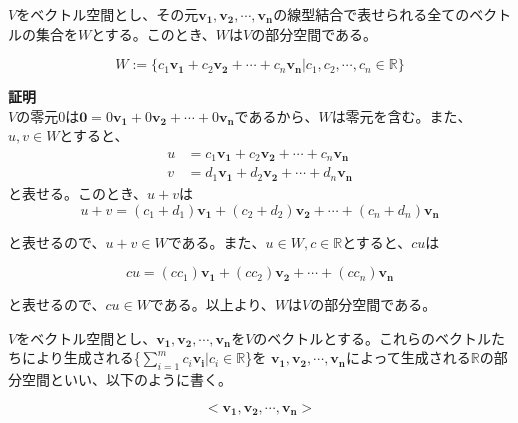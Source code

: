 \documentclass{jlreq}
\begin{document}
\begin{theorembox}[定理1]
  $V$をベクトル空間とし、その元$\boldsymbol{v_1}, \boldsymbol{v_2}, \cdots, \boldsymbol{v_n}$の線型結合で表せられる全てのベクトルの集合を$W$とする。このとき、$W$は$V$の部分空間である。

  \begin{equation*}
    W := \{ c_1 \boldsymbol{v_1} + c_2 \boldsymbol{v_2} + \cdots + c_n \boldsymbol{v_n} | c_1, c_2, \cdots, c_n \in \mathbb{R} \}
  \end{equation*}

  \dotfill

  \textbf{証明} \\

  $V$の零元0は$\boldsymbol{0} = 0 \boldsymbol{v_1} + 0 \boldsymbol{v_2} + \cdots + 0 \boldsymbol{v_n}$であるから、$W$は零元を含む。また、$u, v \in W$とすると、
  \begin{align*}
    u &= c_1 \boldsymbol{v_1} + c_2 \boldsymbol{v_2} + \cdots + c_n \boldsymbol{v_n} \\
    v &= d_1 \boldsymbol{v_1} + d_2 \boldsymbol{v_2} + \cdots + d_n \boldsymbol{v_n}
  \end{align*}
  と表せる。このとき、$u + v$は
  \begin{equation*}
    u + v = (c_1 + d_1) \boldsymbol{v_1} + (c_2 + d_2) \boldsymbol{v_2} + \cdots + (c_n + d_n) \boldsymbol{v_n}
  \end{equation*}

  と表せるので、$u + v \in W$である。また、$u \in W, c \in \mathbb{R}$とすると、$cu$は

  \begin{equation*}
    cu = (cc_1) \boldsymbol{v_1} + (cc_2) \boldsymbol{v_2} + \cdots + (cc_n) \boldsymbol{v_n}
  \end{equation*}

  と表せるので、$cu \in W$である。以上より、$W$は$V$の部分空間である。
\end{theorembox}

\begin{definitionbox}[線型結合の張る空間]
  $V$をベクトル空間とし、$\boldsymbol{v_1}, \boldsymbol{v_2}, \cdots, \boldsymbol{v_n}$を$V$のベクトルとする。これらのベクトルたちにより生成される\{$\sum_{i=1}^m c_i \boldsymbol{v_i} | c_i \in \mathbb{R}$\}を
  $\boldsymbol{v_1}, \boldsymbol{v_2}, \cdots, \boldsymbol{v_n}$によって生成される$\mathbb{R}$の部分空間といい、以下のように書く。

  \begin{equation*}
    <\boldsymbol{v_1}, \boldsymbol{v_2}, \cdots, \boldsymbol{v_n} >
  \end{equation*}
\end{definitionbox}
\end{document}
